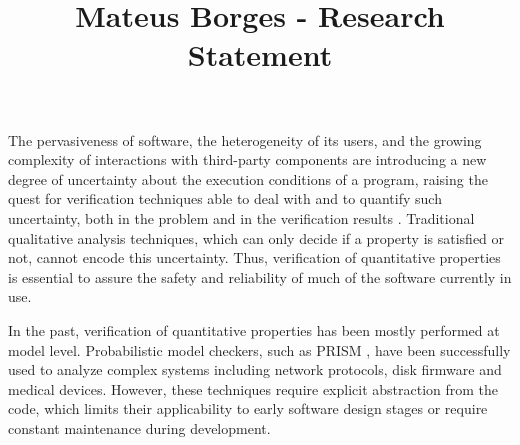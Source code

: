 \documentclass[10pt]{article}
\newcounter{list}
\begin{document}
\title{\vspace{-25mm} Mateus Borges - Research Statement}
\date{}
\author{}
\posttitle{\par\end{center}}
\maketitle

\newcommand{\PSE}{\texttt{PSE}}
\newcommand{\qCORAL}{\texttt{qCORAL}}
\newcommand{\PC}{\textit{PC}}



\vspace{-22mm}

The pervasiveness of software, the heterogeneity of its users, and the
growing complexity of interactions with third-party components are
introducing a new degree of uncertainty about the execution conditions
of a program, raising the quest for verification techniques able to
deal with and to quantify such uncertainty, both in the problem and in
the verification results \cite{borges2015iterative}. Traditional
qualitative analysis techniques, which can only decide if a property
is satisfied or not, cannot encode this uncertainty.  Thus,
verification of quantitative properties is essential to assure the
safety and reliability of much of the software currently in use.

In the past, verification of quantitative properties has been mostly
performed at model level. Probabilistic model checkers, such as PRISM
\cite{kwiatkowska2011prism}, have been successfully used to analyze
complex systems including network protocols, disk firmware and medical
devices.  However, these techniques require explicit abstraction from
the code, which limits their applicability to early software design
stages or require constant maintenance during development.
\end{document}

